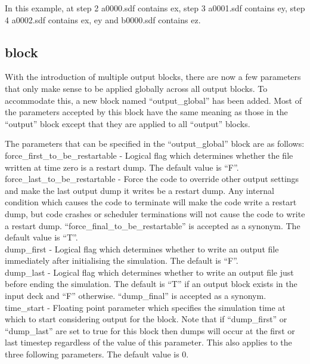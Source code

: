In this example, at step 2 a0000.sdf contains ex, step 3 a0001.sdf
contains ey, step 4 a0002.sdf contains ex, ey and b0000.sdf
contains ez.


\subsection{ block}
\label{sec:output_global_block}

With the introduction of multiple output blocks, there are now a few parameters
that only make sense to be applied globally across all output blocks. To
accommodate this, a new block named ``output\_global'' has been added.
Most of the parameters accepted by this block have the same meaning as those
in the ``output'' block except that they are applied to all ``output'' blocks.

The parameters that can be specified in the ``output\_global'' block are
as follows:\\

{\emphtext force\_first\_to\_be\_restartable} - Logical flag which determines
  whether the file written at time zero is a restart dump. The default value
  is ``F''.\\

{\emphtext force\_last\_to\_be\_restartable} - Force the code to override
other output settings and make the last output dump it writes be a restart
dump. Any internal condition which causes the code to terminate will make the
code write a restart dump, but code crashes or scheduler terminations will not
cause the code to write a restart dump.
``force\_final\_to\_be\_restartable'' is accepted as a synonym.
The default value is ``T''.\\

{\emphtext dump\_first} - Logical flag which determines whether to write an
  output file immediately after initialising the simulation. The default is
  ``F''.\\

{\emphtext dump\_last} - Logical flag which determines whether to write an
  output file just before ending the simulation. The default is ``T'' if
  an output block exists in the input deck and ``F'' otherwise.
  ``dump\_final'' is accepted as a synonym.\\

{\emphtext time\_start} - Floating point parameter which specifies the
  simulation time at which to start considering output for the block. Note
  that if ``dump\_first'' or ``dump\_last'' are set to true for this block then
  dumps will occur at the first or last timestep regardless of the value of this
  parameter. This also applies to the three following parameters.
  The default value is 0.\\


